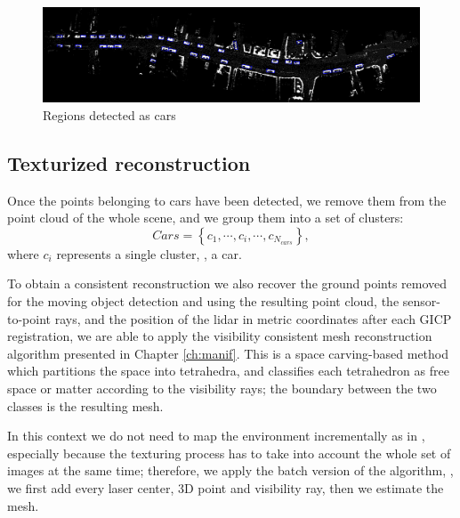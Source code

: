 \begin{figure}[tp]
 \centering
 \includegraphics[width=0.98\columnwidth]{./img/ch-laser/drawing.png}
 \caption{Regions detected as cars}
 \label{fig:drawing}
\end{figure}



\subsection{Texturized reconstruction}
Once the points belonging to cars have been detected, we remove them from the point cloud of the whole scene, and we group them into a set of clusters:
\begin{equation}
Cars = \left\{c_1, \cdots, c_i, \cdots, c_{N_{cars}}  \right\},
\end{equation}
where $c_i$ represents a single cluster, \ie, a car.

To obtain a consistent reconstruction we also recover the ground points removed for the moving object detection and using the resulting point cloud, the sensor-to-point rays, and the position of the lidar in metric coordinates after each GICP registration, we are able to apply the visibility consistent mesh reconstruction algorithm presented in Chapter \ref{ch:manif}.
This is a space carving-based method which partitions the space into tetrahedra, and classifies each tetrahedron as free space or matter according to the visibility rays; the boundary between the two classes is the resulting mesh. 

In this context we do not need to map the environment incrementally as in \cite{romanoni15b}, especially because the texturing process has to take into account the whole set of images at the same time; therefore, we apply the batch version of the algorithm, \ie, we first add every laser center, 3D point and visibility ray, then we estimate the mesh. 


